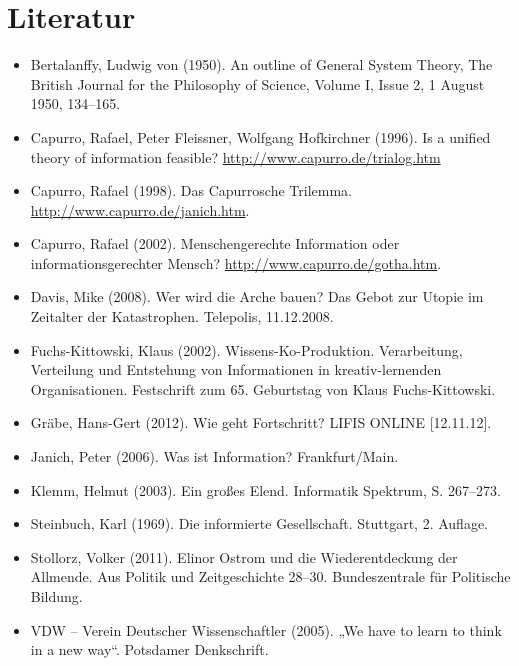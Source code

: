 \documentclass[11pt,a4paper]{article}
\begin{document}
\section*{Literatur}
\raggedright
\begin{itemize}
\item Bertalanffy, Ludwig von (1950). An outline of General System Theory,
  The British Journal for the Philosophy of Science, Volume I, Issue 2, 1
  August 1950, 134–165.
\item Capurro, Rafael, Peter Fleissner, Wolfgang Hofkirchner (1996). Is a
  unified theory of information feasible?
  \url{http://www.capurro.de/trialog.htm}
\item Capurro, Rafael (1998). Das Capurrosche Trilemma.
  \url{http://www.capurro.de/janich.htm}.
\item Capurro, Rafael (2002). Menschengerechte Information oder
  informationsgerechter Mensch? \url{http://www.capurro.de/gotha.htm}.
\item Davis, Mike (2008). Wer wird die Arche bauen?  Das Gebot zur Utopie im
  Zeitalter der Katastrophen.  Telepolis, 11.12.2008.
\item Fuchs-Kittowski, Klaus (2002). Wissens-Ko-Produktion.  Verarbeitung,
  Verteilung und Entstehung von Informationen in kreativ-lernenden
  Organisationen.  Festschrift zum 65. Geburtstag von Klaus Fuchs-Kittowski.
\item Gräbe, Hans-Gert (2012). Wie geht Fortschritt? LIFIS ONLINE [12.11.12]. 
\item Janich, Peter (2006). Was ist Information? Frankfurt/Main.
\item Klemm, Helmut (2003). Ein großes Elend. Informatik Spektrum,
  S. 267--273. 
\item Steinbuch, Karl (1969). Die informierte Gesellschaft.  Stuttgart,
  2. Auflage. 
\item Stollorz, Volker (2011). Elinor Ostrom und die Wiederentdeckung der
  Allmende. Aus Politik und Zeitgeschichte 28--30. Bundeszentrale für
  Politische Bildung. 
\item VDW -- Verein Deutscher Wissenschaftler (2005). „We have to learn to
  think in a new way“. Potsdamer Denkschrift.
\end{itemize}
\end{document}
